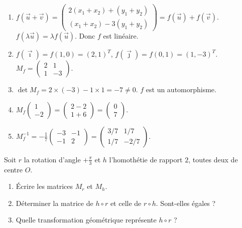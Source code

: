 \documentclass[11pt]{article}
\begin{document}
\begin{corrige}[Exercice 2]
\begin{enumerate}
  \item $f(\vec{u}+\vec{v}) = \begin{pmatrix} 2(x_1+x_2)+(y_1+y_2) \\ (x_1+x_2)-3(y_1+y_2) \end{pmatrix} = f(\vec{u})+f(\vec{v})$. $f(\lambda\vec{u}) = \lambda f(\vec{u})$. Donc $f$ est linéaire.
  \item $f(\vec{\imath}) = f(1,0) = (2,1)^T$, $f(\vec{\jmath}) = f(0,1) = (1,-3)^T$.
  $M_f = \begin{pmatrix} 2 & 1 \\ 1 & -3 \end{pmatrix}$.
  \item $\det M_f = 2\times(-3) - 1\times1 = -7 \neq 0$. $f$ est un automorphisme.
  \item $M_f \begin{pmatrix} 1 \\ -2 \end{pmatrix} = \begin{pmatrix} 2-2 \\ 1+6 \end{pmatrix} = \begin{pmatrix} 0 \\ 7 \end{pmatrix}$.
  \item $M_f^{-1} = -\frac{1}{7}\begin{pmatrix} -3 & -1 \\ -1 & 2 \end{pmatrix} = \begin{pmatrix} 3/7 & 1/7 \\ 1/7 & -2/7 \end{pmatrix}$.
\end{enumerate}
\end{corrige}

\begin{exercice}
Soit $r$ la rotation d'angle $+\frac{\pi}{3}$ et $h$ l'homothétie de rapport $2$, toutes deux de centre $O$.
\begin{enumerate}
  \item Écrire les matrices $M_r$ et $M_h$.
  \item Déterminer la matrice de $h\circ r$ et celle de $r\circ h$. Sont-elles égales ?
  \item Quelle transformation géométrique représente $h\circ r$ ?
\end{enumerate}
\end{exercice}
\end{document}
